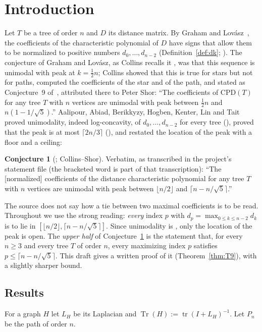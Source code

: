 \documentclass[11pt]{amsart}
\theoremstyle{definition}
\newtheorem{conjecture}[theorem]{Conjecture}
\theoremstyle{remark}
\newcommand{\tr}{\operatorname{tr}}
\newcommand{\Tr}{\operatorname{Tr}}
\begin{document}
\section{Introduction}\label{sec:intro}

Let $T$ be a tree of order $n$ and $D$ its distance matrix. By Graham and
Lov\'asz~\cite{GL78}, the coefficients of the characteristic polynomial of
$D$ have signs that allow them to be normalized to positive numbers
$d_0,\dots,d_{n-2}$ (Definition~\ref{def:dk}; \cite[Fact~1.1]{AAB}). The
conjecture of Graham and Lov\'asz, as Collins recalls it
\cite[p.~29]{Col89}, was that this sequence is unimodal with peak at
$k=\frac12n$; Collins showed that this is true for stars but not for paths,
computed the coefficients of the star and of the path, and stated as
Conjecture~9 of~\cite{Col89}, attributed there to Peter Shor:
``The coefficients of $\mathrm{CPD}(T)$ for any tree $T$ with $n$ vertices
are unimodal with peak between $\tfrac12 n$ and $n(1-1/\sqrt5)$.''
Aalipour, Abiad, Berikkyzy, Hogben, Kenter, Lin and Tait~\cite{AAB} proved
unimodality, indeed log-concavity, of $d_0,\dots,d_{n-2}$ for every tree
(\cite[Theorem~2.1]{AAB}), proved that the peak is at most
$\lceil 2n/3\rceil$ (\cite[Theorem~3.3]{AAB}), and restated the location of
the peak with a floor and a ceiling:

\begin{conjecture}[{\cite[Conjecture~1.2]{AAB}}; Collins--Shor]\label{conj:CS}
Verbatim, as transcribed in the project's statement file (the bracketed word
is part of that transcription): ``The [normalized] coefficients of the
distance characteristic polynomial for any tree $T$ with $n$ vertices are
unimodal with peak between $\lfloor n/2\rfloor$ and
$\lceil n-n/\sqrt5\rceil$.''
\end{conjecture}

The source does not say how a tie between two maximal coefficients is to be
read. Throughout we use the strong reading: \emph{every} index $p$ with
$d_p=\max_{0\le k\le n-2}d_k$ is to lie in
$[\lfloor n/2\rfloor,\lceil n-n/\sqrt5\rceil]$. Since unimodality is
\cite[Theorem~2.1]{AAB}, only the location of the peak is open. The
\emph{upper half} of Conjecture~\ref{conj:CS} is the statement that, for
every $n\ge3$ and every tree $T$ of order $n$, every maximizing index $p$
satisfies $p\le\lceil n-n/\sqrt5\rceil$. This draft gives a written proof of
it (Theorem~\ref{thm:T9}), with a slightly sharper bound.

\subsection*{Results}
For a graph $H$ let $L_H$ be its Laplacian and
$\Tr(H):=\tr(I+L_H)^{-1}$. Let $P_n$ be the path of order $n$.
\end{document}
